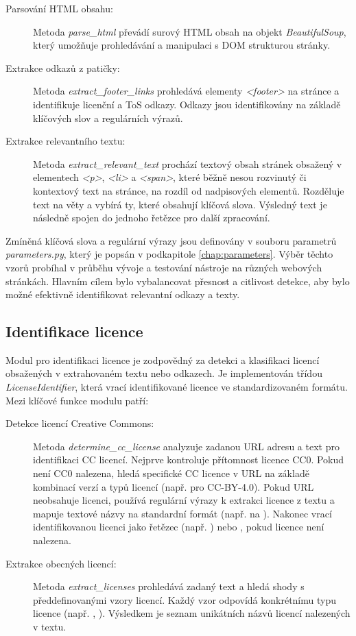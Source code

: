 \begin{description}
    \item[Parsování HTML obsahu:] Metoda \textit{parse\_html} převádí surový HTML obsah na objekt \textit{BeautifulSoup}, který umožňuje prohledávání a manipulaci s DOM strukturou stránky.
    \item[Extrakce odkazů z patičky:] Metoda \textit{extract\_footer\_links} prohledává elementy \textit{<footer>} na stránce a identifikuje licenční a ToS odkazy. Odkazy jsou identifikovány na základě klíčových slov a regulárních výrazů.
    \item[Extrakce relevantního textu:] Metoda \textit{extract\_relevant\_text} prochází textový obsah stránek obsažený v elementech \textit{<p>}, \textit{<li>} a \textit{<span>}, které běžně nesou rozvinutý či kontextový text na stránce, na rozdíl od nadpisových elementů. Rozděluje text na věty a vybírá ty, které obsahují klíčová slova. Výsledný text je následně spojen do jednoho řetězce pro další zpracování.
\end{description}

Zmíněná klíčová slova a regulární výrazy jsou definovány v souboru parametrů \textit{parameters.py}, který je popsán v podkapitole \ref{chap:parameters}.
Výběr těchto vzorů probíhal v průběhu vývoje a testování nástroje na různých webových stránkách.
Hlavním cílem bylo vybalancovat přesnost a citlivost detekce, aby bylo možné efektivně identifikovat relevantní odkazy a texty.


\subsection{Identifikace licence}
Modul pro identifikaci licence je zodpovědný za detekci a klasifikaci licencí obsažených v extrahovaném textu nebo odkazech.
Je implementován třídou \textit{LicenseIdentifier}, která vrací identifikované licence ve standardizovaném formátu.
Mezi klíčové funkce modulu patří:

\begin{description}
    \item[Detekce licencí Creative Commons:] Metoda \textit{determine_cc_license} analyzuje zadanou URL adresu a text pro identifikaci CC licencí. Nejprve kontroluje přítomnost licence CC0. Pokud není CC0 nalezena, hledá specifické CC licence v URL na základě kombinací verzí a typů licencí (např.  pro CC-BY-4.0). Pokud URL neobsahuje licenci, používá regulární výrazy k extrakci licence z textu a mapuje textové názvy na standardní formát (např.  na ). Nakonec vrací identifikovanou licenci jako řetězec (např. ) nebo , pokud licence není nalezena.
    \item[Extrakce obecných licencí:] Metoda \textit{extract_licenses} prohledává zadaný text a hledá shody s předdefinovanými vzory licencí. Každý vzor odpovídá konkrétnímu typu licence (např. , ). Výsledkem je seznam unikátních názvů licencí nalezených v textu.
\end{description}

